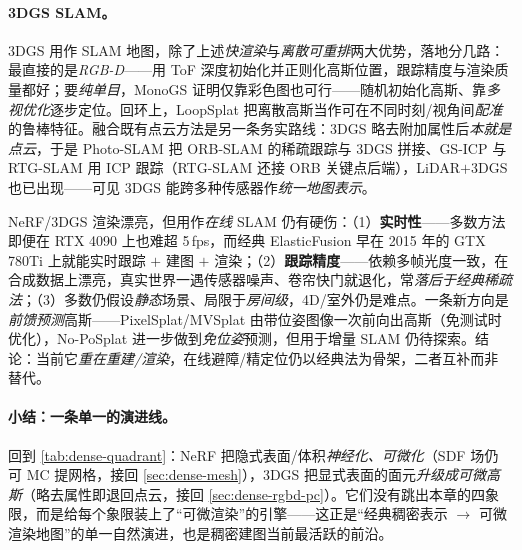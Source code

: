 \paragraph{3DGS SLAM。}
3DGS 用作 SLAM 地图，除了上述\emph{快渲染}与\emph{离散可重排}两大优势，落地分几路：最直接的是\emph{RGB-D}——用 ToF 深度初始化并正则化高斯位置，跟踪精度与渲染质量都好；要\emph{纯单目}，MonoGS\cite{matsuki2024monogs} 证明仅靠彩色图也可行——随机初始化高斯、靠\emph{多视优化}逐步定位。回环上，LoopSplat\cite{zhu2024loopsplat} 把离散高斯当作可在不同时刻/视角间\emph{配准}的鲁棒特征。融合既有点云方法是另一条务实路线：3DGS 略去附加属性后\emph{本就是点云}，于是 Photo-SLAM 把 ORB-SLAM 的稀疏跟踪与 3DGS 拼接、GS-ICP 与 RTG-SLAM 用 ICP 跟踪（RTG-SLAM 还接 ORB 关键点后端），LiDAR$+$3DGS 也已出现——可见 3DGS 能跨多种传感器作\emph{统一地图表示}。

\begin{pitfall}
NeRF/3DGS 渲染漂亮，但用作\emph{在线} SLAM 仍有硬伤\cite{matsuki2024monogs}：（1）\textbf{实时性}——多数方法即便在 RTX 4090 上也难超 5\,fps，而经典 ElasticFusion 早在 2015 年的 GTX 780Ti 上就能实时跟踪 $+$ 建图 $+$ 渲染；（2）\textbf{跟踪精度}——依赖多帧光度一致，在合成数据上漂亮，真实世界一遇传感器噪声、卷帘快门就退化，常\emph{落后于经典稀疏法}；（3）多数仍假设\emph{静态}场景、局限于\emph{房间级}，4D/室外仍是难点。一条新方向是\emph{前馈预测}高斯——PixelSplat/MVSplat 由带位姿图像一次前向出高斯（免测试时优化），No-PoSplat\cite{charatan2024pixelsplat} 进一步做到\emph{免位姿}预测，但用于增量 SLAM 仍待探索。结论：当前它\emph{重在重建/渲染}，在线避障/精定位仍以经典法为骨架，二者互补而非替代。
\end{pitfall}

\paragraph{小结：一条单一的演进线。}
回到 \cref{tab:dense-quadrant}：NeRF 把隐式表面/体积\emph{神经化、可微化}（SDF 场仍可 MC 提网格，接回 \cref{sec:dense-mesh}），3DGS 把显式表面的面元\emph{升级成可微高斯}（略去属性即退回点云，接回 \cref{sec:dense-rgbd-pc}）。它们没有跳出本章的四象限，而是给每个象限装上了“可微渲染”的引擎——这正是“经典稠密表示 $\to$ 可微渲染地图”的单一自然演进，也是稠密建图当前最活跃的前沿。

